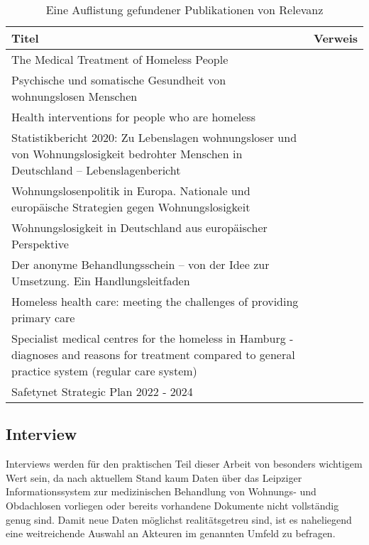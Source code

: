 \begin{table}[H]
	\centering
	\textwidth
	\begin{tabulary}{\textwidth}{LL}
		\toprule
		Titel							&	Verweis\\
		\midrule
		The Medical Treatment of Homeless People&
		\citet{Kaduszkiewicz.2017}\\
		Psychische und somatische Gesundheit von wohnungslosen Menschen&
		\citet{DAE228829}\\
		Health interventions for people who are homeless&
		\citet{Hwang.2014}\\
		Statistikbericht 2020: Zu Lebenslagen wohnungsloser und von Wohnungslosigkeit bedrohter Menschen in Deutschland -- Lebenslagenbericht&
		\citet{BAGW.2022}\\
		Wohnungslosenpolitik in Europa. Nationale und europäische Strategien gegen Wohnungslosigkeit&
		\citet{Busch-Geertsema.2012}\\
		Wohnungslosigkeit in Deutschland aus europäischer Perspektive&
		\citet{Busch-Geertsema.2018}\\
		Der anonyme Behandlungsschein -- von der Idee zur Umsetzung. Ein Handlungsleitfaden & \citet{Zanders.2022}\\
		Homeless health care: meeting the challenges of providing primary care &	\citet{Davies.2018}\\
		Specialist medical centres for the homeless in Hamburg - diagnoses and reasons for treatment compared to general practice system (regular care system)&
		\citet{Leeden.2023}\\
		Safetynet Strategic Plan 2022 - 2024&
		\citet{Safetynet.2022}\\
		\bottomrule
	\end{tabulary}
	\caption[Relevante Publikationen]{Eine Auflistung gefundener Publikationen von Relevanz}
	\label{tab:pub}
\end{table}

\subsection{Interview}

Interviews werden für den praktischen Teil dieser Arbeit von besonders wichtigem Wert sein, da nach aktuellem Stand kaum Daten über das Leipziger Informationssystem zur medizinischen Behandlung von Wohnungs- und Obdachlosen vorliegen oder bereits vorhandene Dokumente nicht vollständig genug sind. Damit neue Daten möglichst realitätsgetreu sind, ist es naheliegend eine weitreichende Auswahl an Akteuren im genannten Umfeld zu befragen.

